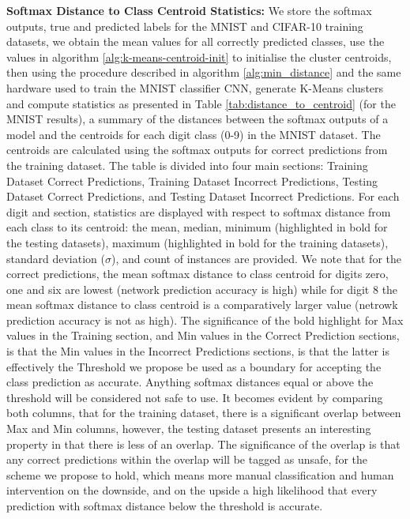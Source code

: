 \noindent \textbf{Softmax Distance to Class Centroid Statistics:} We store the softmax outputs, true and predicted labels for the MNIST and CIFAR-10 training datasets, we obtain the mean values for all correctly predicted classes, use the values in algorithm \ref{alg:k-means-centroid-init}  to initialise the cluster centroids, then using the procedure described in algorithm \ref{alg:min_distance} and the same hardware used to train the MNIST classifier CNN, generate K-Means clusters and compute statistics as presented in Table \ref{tab:distance_to_centroid} (for the MNIST results), a summary of the distances between the softmax outputs of a model and the centroids for each digit class (0-9) in the MNIST dataset. The centroids are calculated using the softmax outputs for correct predictions from the training dataset. The table is divided into four main sections: Training Dataset Correct Predictions, Training Dataset Incorrect Predictions, Testing Dataset Correct Predictions, and Testing Dataset Incorrect Predictions. For each digit and section, statistics are displayed with respect to softmax distance from each class to its centroid: the mean, median, minimum (highlighted in bold for the testing datasets), maximum (highlighted in bold for the training datasets), standard deviation ($\sigma$), and count of instances are provided. We note that for the correct predictions, the mean softmax distance to class centroid for digits zero, one and six are lowest (network prediction accuracy is high) while for digit 8 the mean softmax distance to class centroid is a comparatively larger value (netrowk prediction accuracy is not as high). The significance of the bold highlight for Max values in the Training section, and Min values in the Correct Prediction sections, is that the Min values in the Incorrect Predictions sections, is that the latter is effectively the Threshold we propose be used as a boundary for accepting the class prediction as accurate. Anything softmax distances equal or above the threshold will be considered not safe to use. It becomes evident by comparing both columns, that for the training dataset, there is a significant overlap between Max and Min columns, however, the testing dataset presents an interesting property in that there is less of an overlap. The significance of the overlap is that any correct predictions within the overlap will be tagged as unsafe, for the scheme we propose to hold, which means more manual classification and human intervention on the downside, and on the upside a high likelihood that every prediction with softmax distance below the threshold is accurate.

